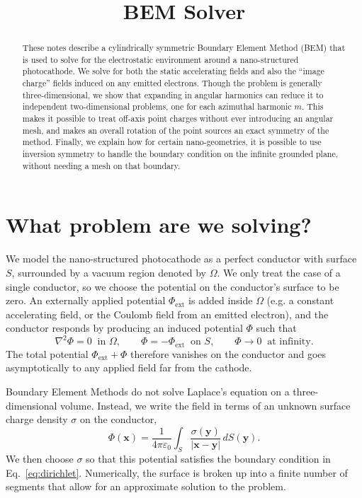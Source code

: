 \documentclass[11pt]{article}
\title{BEM Solver}
\author{}
\date{}
\begin{document}
\maketitle

\begin{abstract}
These notes describe a cylindrically symmetric Boundary Element Method (BEM) that is used to solve for the electrostatic environment around a nano-structured photocathode. We solve for both the static accelerating fields and also the ``image charge'' fields induced on any emitted electrons. Though the problem is generally three-dimensional, we show that expanding in angular harmonics can reduce it to independent two-dimensional problems, one for each
azimuthal harmonic $m$.  This makes it possible to treat off-axis point charges
without ever introducing an angular mesh, and makes an overall rotation of the point sources an exact symmetry of the method. Finally, we explain how for certain nano-geometries, it is possible to use inversion symmetry to handle the boundary condition on the infinite grounded plane, without needing a mesh on that boundary.
\end{abstract}

\section{What problem are we solving?}

We model the nano-structured photocathode as a perfect conductor with surface $S$, surrounded by a vacuum region denoted by $\Omega$. We only treat the case of a single conductor, so we choose the potential on the conductor's surface to be zero.
An externally applied potential
$\Phi_{\mathrm{ext}}$ is added inside $\Omega$ (e.g. a constant accelerating field, or the Coulomb field from an emitted electron), and the
conductor responds by producing an induced potential $\Phi$ such that
\begin{equation}
  \nabla^2 \Phi = 0 \ \text{ in } \Omega,
  \qquad
  \Phi = -\Phi_{\mathrm{ext}} \ \text{ on } S,
  \qquad
  \Phi \to 0 \ \text{ at infinity}.
  \label{eq:dirichlet}
\end{equation}
The total potential $\Phi_{\mathrm{ext}}+\Phi$ therefore vanishes on the conductor and goes asymptotically to any applied field far from the cathode.

Boundary Element Methods do not solve Laplace's equation on a three-dimensional volume.
Instead, we write the field in terms of an unknown surface charge density $\sigma$ on
the conductor,
\begin{equation}
  \Phi(\mathbf{x}) = \frac{1}{4\pi\varepsilon_0}
  \int_S \frac{\sigma(\mathbf{y})}{|\mathbf{x}-\mathbf{y}|}
  \, dS(\mathbf{y}).
  \label{eq:single-layer}
\end{equation}
We then choose $\sigma$ so that this potential satisfies the boundary condition
in Eq.~\eqref{eq:dirichlet}.  Numerically, the surface is broken up into a finite number of segments that allow for an approximate solution to the problem.
\end{document}
